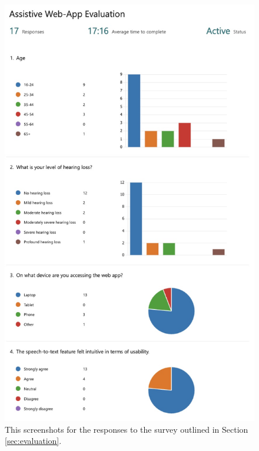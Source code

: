 \documentclass{l4proj}
\begin{document}
\begin{appendices}
\begin{figure}[H]
    \centering
    \includegraphics[width=0.75\linewidth]{dissertation/images/eval-1.jpeg}    
    \caption{This screenshots for the responses to the survey outlined in Section \ref{sec:evaluation}.}
    \label{fig:eval-survey-1} 
\end{figure}


\end{appendices}
\end{document}
